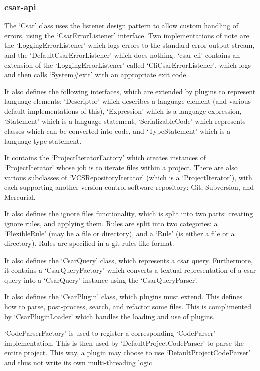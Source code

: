 \documentclass[12pt, letterpaper]{article}
\begin{document}
\subsubsection{csar-api}
The `Csar' class uses the listener design pattern to allow custom handling of errors, using the `CsarErrorListener' interface.
Two implementations of note are the `LoggingErrorListener' which logs errors to the standard error output stream, and the `DefaultCsarErrorListener' which does nothing.
`csar-cli' contains an extension of the `LoggingErrorListener' called `CliCsarErrorListener', which logs and then calls `System\#exit' with an appropriate exit code.

It also defines the following interfaces, which are extended by plugins to represent language elements: `Descriptor' which describes a language element (and various default implementations of this), `Expression' which is a language expression, `Statement' which is a language statement, `SerializableCode' which represents classes which can be converted into code, and `TypeStatement' which is a language type statement.

It contains the `ProjectIteratorFactory' which creates instances of `ProjectIterator' whose job is to iterate files within a project.
There are also various subclasses of `VCSRepositoryIterator' (which is a `ProjectIterator'), with each supporting another version control software repository: Git, Subversion, and Mercurial.

It also defines the ignore files functionality, which is split into two parts: creating ignore rules, and applying them.
Rules are split into two categories: a `FlexibleRule' (may be a file or directory), and a `Rule' (is either a file or a directory).
Rules are specified in a git rules-like format.

It also defines the `CsarQuery' class, which represents a csar query.
Furthermore, it contains a `CsarQueryFactory' which converts a textual representation of a csar query into a `CsarQuery' instance using the `CsarQueryParser'.

It also defines the `CsarPlugin' class, which plugins must extend.
This defines how to parse, post-process, search, and refactor some files.
This is complimented by `CsarPluginLoader' which handles the loading and use of plugins.

`CodeParserFactory' is used to register a corresponding `CodeParser' implementation.
This is then used by `DefaultProjectCodeParser' to parse the entire project.
This way, a plugin may choose to use `DefaultProjectCodeParser' and thus not write its own multi-threading logic.
\end{document}
